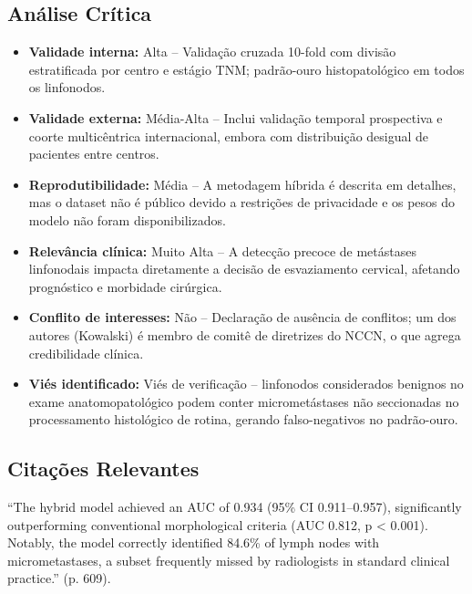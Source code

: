 \subsection{Análise Crítica}
\begin{itemize}
  \item \textbf{Validade interna:} Alta -- Validação cruzada 10-fold com
        divisão estratificada por centro e estágio TNM; padrão-ouro
        histopatológico em todos os linfonodos.
  \item \textbf{Validade externa:} Média-Alta -- Inclui validação temporal
        prospectiva e coorte multicêntrica internacional, embora com
        distribuição desigual de pacientes entre centros.
  \item \textbf{Reprodutibilidade:} Média -- A metodagem híbrida é descrita
        em detalhes, mas o dataset não é público devido a restrições de
        privacidade e os pesos do modelo não foram disponibilizados.
  \item \textbf{Relevância clínica:} Muito Alta -- A detecção precoce de
        metástases linfonodais impacta diretamente a decisão de esvaziamento
        cervical, afetando prognóstico e morbidade cirúrgica.
  \item \textbf{Conflito de interesses:} Não -- Declaração de ausência de
        conflitos; um dos autores (Kowalski) é membro de comitê de
        diretrizes do NCCN, o que agrega credibilidade clínica.
  \item \textbf{Viés identificado:} Viés de verificação -- linfonodos
        considerados benignos no exame anatomopatológico podem conter
        micrometástases não seccionadas no processamento histológico de
        rotina, gerando falso-negativos no padrão-ouro.
\end{itemize}

\subsection{Citações Relevantes}
\begin{citacao}
``The hybrid model achieved an AUC of 0.934 (95\% CI 0.911--0.957),
significantly outperforming conventional morphological criteria (AUC 0.812,
p < 0.001). Notably, the model correctly identified 84.6\% of lymph nodes
with micrometastases, a subset frequently missed by radiologists in
standard clinical practice.'' (p. 609).
\end{citacao}

